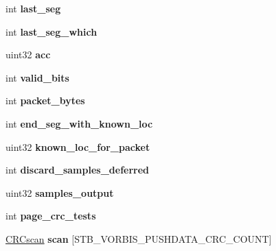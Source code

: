 \begin{DoxyCompactItemize}
\item 
\hypertarget{structstb__vorbis_a28cbcd18e6bd3f2749814b40505cab63}{int {\bfseries last\-\_\-seg}}\label{structstb__vorbis_a28cbcd18e6bd3f2749814b40505cab63}

\item 
\hypertarget{structstb__vorbis_afe2aa2e9d9536a1f8eed69da2d59888d}{int {\bfseries last\-\_\-seg\-\_\-which}}\label{structstb__vorbis_afe2aa2e9d9536a1f8eed69da2d59888d}

\item 
\hypertarget{structstb__vorbis_a54a0daf5db3dc593cdff97a6df20fc3b}{uint32 {\bfseries acc}}\label{structstb__vorbis_a54a0daf5db3dc593cdff97a6df20fc3b}

\item 
\hypertarget{structstb__vorbis_a4aa9d73a234428a6194cd37b8c0be4e0}{int {\bfseries valid\-\_\-bits}}\label{structstb__vorbis_a4aa9d73a234428a6194cd37b8c0be4e0}

\item 
\hypertarget{structstb__vorbis_a3328726a6d040dbc75a5d2e0f34232c3}{int {\bfseries packet\-\_\-bytes}}\label{structstb__vorbis_a3328726a6d040dbc75a5d2e0f34232c3}

\item 
\hypertarget{structstb__vorbis_abf4405ff473eed0c4a8bf23cb064f1aa}{int {\bfseries end\-\_\-seg\-\_\-with\-\_\-known\-\_\-loc}}\label{structstb__vorbis_abf4405ff473eed0c4a8bf23cb064f1aa}

\item 
\hypertarget{structstb__vorbis_ab4f2b28e26cb9f9a060a7b7855f12ece}{uint32 {\bfseries known\-\_\-loc\-\_\-for\-\_\-packet}}\label{structstb__vorbis_ab4f2b28e26cb9f9a060a7b7855f12ece}

\item 
\hypertarget{structstb__vorbis_adbacf2120eaa0099f886770c51d633d2}{int {\bfseries discard\-\_\-samples\-\_\-deferred}}\label{structstb__vorbis_adbacf2120eaa0099f886770c51d633d2}

\item 
\hypertarget{structstb__vorbis_a6b955aa04bfd9f4a59bca3d8d027b592}{uint32 {\bfseries samples\-\_\-output}}\label{structstb__vorbis_a6b955aa04bfd9f4a59bca3d8d027b592}

\item 
\hypertarget{structstb__vorbis_a4d3ba492214db27970d9292a3d60b421}{int {\bfseries page\-\_\-crc\-\_\-tests}}\label{structstb__vorbis_a4d3ba492214db27970d9292a3d60b421}

\item 
\hypertarget{structstb__vorbis_ac2972ae486c5a1bc59e1f0ebb3fa0739}{\hyperlink{structCRCscan}{C\-R\-Cscan} {\bfseries scan} \mbox{[}S\-T\-B\-\_\-\-V\-O\-R\-B\-I\-S\-\_\-\-P\-U\-S\-H\-D\-A\-T\-A\-\_\-\-C\-R\-C\-\_\-\-C\-O\-U\-N\-T\mbox{]}}\label{structstb__vorbis_ac2972ae486c5a1bc59e1f0ebb3fa0739}


\end{DoxyCompactItemize}
